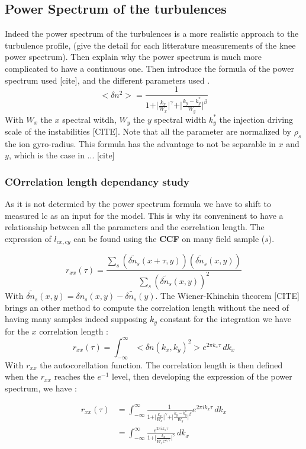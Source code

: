 \documentclass[11pt,a4paper,openany]{report}
\begin{document}
\begin{multicols}{2}
    \subsection{Power Spectrum of the turbulences}
    Indeed the power spectrum of the turbulences is a more realistic approach to the turbulence profile, (give the detail for each litterature measurements of the knee power spectrum). Then explain why the power spectrum is much more complicated to have a continuous one.
    Then introduce the formula of the power spectrum used [cite], and the different parameters used .
    $$<\delta n^2 > = \frac{1}{1 + \vert \frac{k_x}{W_x} \vert^\gamma + \vert \frac{k_y - k_y^*}{W_y}\vert^\beta}$$
    With $W_x$ the $x$ spectral witdh, $W_y$ the $y$ spectral width $k_y^*$ the injection driving scale of the instabilities [CITE]. Note that all the parameter are normalized by $\rho_s$ the ion gyro-radius.  This formula has the advantage to not be separable in $x$ and $y$, which is the case in ... [cite]

    \subsubsection{COrrelation length dependancy study}
    As it is not determied by the power spectrum formula we have to shift to measured lc as an input for the model. This is why its conveninent to have a relationship between all the parameters and the correlation length. The expression of $l_{cx,cy}$ can be found using the \textbf{CCF} on many field sample ($s$).

    $$r_{x x}(\tau) = \frac{\sum_{s}\left(\tilde{\delta n_s}(x + \tau, y)\right)\left(\tilde{\delta n_s}(x, y)\right)}{\sum_{s}\left(\tilde{\delta n_s}(x, y)\right)^2}$$
    With $\tilde{\delta n_s}(x,y) = \delta n_s(x,y) - \bar{\delta n_s}(y)$. The Wiener-Khinchin theorem [CITE] brings an other method to compute the correlation length without the need of having many samples indeed supposing $k_y$ constant for the integration we have for the $x$ correlation length :
    $$r_{x x}(\tau) = \int_{-\infty}^{\infty} <\delta n(k_x, k_y)^2> e^{2 \pi k_x \tau} \, dk_x$$
    With $r_{x x}$ the autocorellation function. The correlation length is then defined when the $r_{x x}$ reaches the $e^{-1}$ level, then developing the expression of the power spectrum, we have :

    \begin{align}
        r_{x x}(\tau) & = \int_{-\infty}^{\infty} \frac{1}{1 + \vert \frac{k_x}{W_x} \vert^\gamma + \vert \frac{k_y - k_y^*}{W_y}\vert^\beta} e^{2 \pi i k_x \tau} \, dk_x \\
                      & = \int_{-\infty}^{\infty} \frac{e^{2 \pi i k_x \tau}}{1 + \vert \frac{k_x}{W_x C^{1/ \gamma}} \vert^\gamma} \, dk_x
    \end{align}


\end{multicols}
\end{document}
